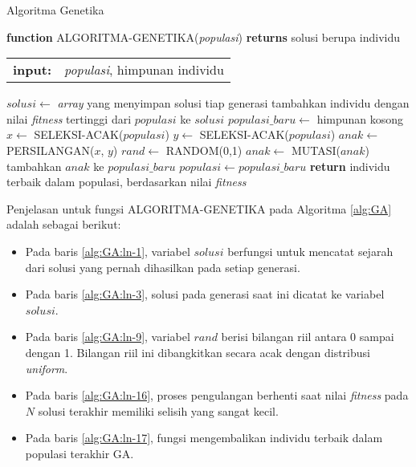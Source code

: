 \begin{algorithm}[H]
	\caption{Algoritma Genetika \cite{russell2016artificial}}
	\label{alg:GA}
	\begin{flushleft}
		\textbf{function} ALGORITMA-GENETIKA(\textit{populasi}) \textbf{returns} solusi berupa individu
		\begin{flushleft}
			\begin{tabular}{ l l }
  				\textbf{input:} & \textit{populasi}, himpunan individu
			\end{tabular}
			\hspace{5pt}  
		\end{flushleft}
	\end{flushleft}
	\begin{algorithmic}[1]
		\STATE $solusi \leftarrow$ \textit{array} yang menyimpan solusi tiap generasi \label{alg:GA:ln-1}
		\REPEAT \label{alg:GA:ln-2}
			\STATE tambahkan individu dengan nilai \textit{fitness} tertinggi dari $populasi$ ke $solusi$ \label{alg:GA:ln-3}
			\STATE $populasi\_baru \leftarrow$ himpunan kosong \label{alg:GA:ln-4}
			 \label{alg:GA:ln-5}
				\STATE $x \leftarrow$ SELEKSI-ACAK($populasi$) \label{alg:GA:ln-6}
				\STATE $y \leftarrow$ SELEKSI-ACAK($populasi$) \label{alg:GA:ln-7}
				\STATE $anak \leftarrow$ PERSILANGAN($x$, $y$) \label{alg:GA:ln-8}
				\STATE $rand \leftarrow$ RANDOM(0,1) \label{alg:GA:ln-9}
				 \label{alg:GA:ln-10}
					\STATE $anak \leftarrow$ MUTASI($anak$) \label{alg:GA:ln-11}
				\ENDIF \label{alg:GA:ln-12}
				\STATE tambahkan $anak$ ke $populasi\_baru$ \label{alg:GA:ln-13}
			\ENDFOR \label{alg:GA:ln-14}
			\STATE $populasi \leftarrow populasi\_baru$ \label{alg:GA:ln-15}
		 \label{alg:GA:ln-16}
		\STATE \textbf{return} individu terbaik dalam populasi, berdasarkan nilai \textit{fitness} \label{alg:GA:ln-17}
	\end{algorithmic}
\end{algorithm}

Penjelasan untuk fungsi  ALGORITMA-GENETIKA pada Algoritma \ref{alg:GA} adalah sebagai berikut:
\begin{itemize}
	\item Pada baris \ref{alg:GA:ln-1}, variabel $solusi$ berfungsi untuk mencatat sejarah dari solusi yang pernah dihasilkan pada setiap generasi.
	\item Pada baris \ref{alg:GA:ln-3}, solusi pada generasi saat ini dicatat ke variabel $solusi$.
	\item Pada baris \ref{alg:GA:ln-9}, variabel $rand$ berisi bilangan riil antara 0 sampai dengan 1. Bilangan riil ini dibangkitkan secara acak dengan distribusi \textit{uniform}.
	\item Pada baris \ref{alg:GA:ln-16}, proses pengulangan berhenti saat nilai \textit{fitness} pada $N$ solusi terakhir memiliki selisih yang sangat kecil.
	\item Pada baris \ref{alg:GA:ln-17}, fungsi mengembalikan individu terbaik dalam populasi terakhir GA.
\end{itemize}

